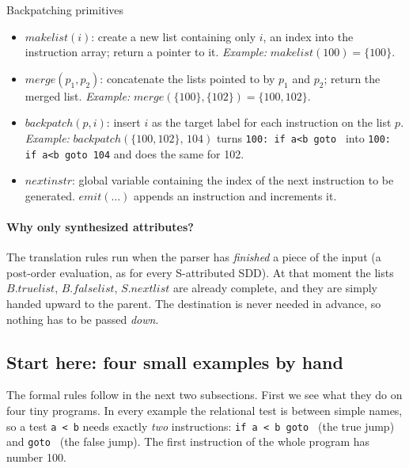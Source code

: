 \documentclass[11pt,a4paper]{article}
\newcommand{\at}[2]{\ensuremath{#1.\mathit{#2}}}
\begin{document}
\begin{defbox}{Backpatching primitives}
\begin{itemize}
\item $\mathit{makelist}(i)$: create a new list containing only $i$, an index into the instruction array; return a pointer to it. \emph{Example:} $\mathit{makelist}(100)=\{100\}$.
\item $\mathit{merge}(p_1, p_2)$: concatenate the lists pointed to by $p_1$ and $p_2$; return the merged list. \emph{Example:} $\mathit{merge}(\{100\},\{102\})=\{100,102\}$.
\item $\mathit{backpatch}(p, i)$: insert $i$ as the target label for each instruction on the list $p$. \emph{Example:} $\mathit{backpatch}(\{100,102\},\,104)$ turns \texttt{100: if a<b goto \blk} into \texttt{100: if a<b goto 104} and does the same for 102.
\item $\mathit{nextinstr}$: global variable containing the index of the next instruction to be generated. $\mathit{emit}(\dots)$ appends an instruction and increments it.
\end{itemize}
\end{defbox}

\paragraph{Why only synthesized attributes?} The translation rules run when the parser has \emph{finished} a piece of the input (a post-order evaluation, as for every S-attributed SDD). At that moment the lists \at{B}{truelist}, \at{B}{falselist}, \at{S}{nextlist} are already complete, and they are simply handed upward to the parent. The destination is never needed in advance, so nothing has to be passed \emph{down}.

\subsection{Start here: four small examples by hand}
The formal rules follow in the next two subsections. First we see what they do on four tiny programs. In every example the relational test is between simple names, so a test \texttt{a < b} needs exactly \emph{two} instructions: \texttt{if a < b goto \blk} (the true jump) and \texttt{goto \blk} (the false jump). The first instruction of the whole program has number 100.
\end{document}
